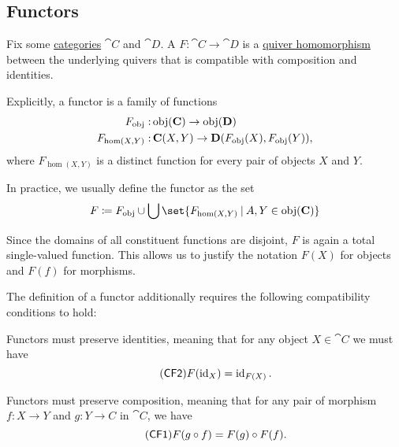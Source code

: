 \subsection{Functors}\label{subsec:functors}

\begin{definition}\label{def:functor}
  Fix some \hyperref[def:category]{categories} \( \cat{C} \) and \( \cat{D} \). A  \( F: \cat{C} \to \cat{D} \) is a \hyperref[def:theory_of_graphs/quiver_homomorphism]{quiver homomorphism} between the underlying quivers that is compatible with composition and identities.

  Explicitly, a functor is a family of functions
  \begin{equation}\label{eq:def:functor_as_family_of_function}
    \begin{aligned}
      F_{\operatorname{obj}}:       &\operatorname{obj}(\operatorname{\mathbf{C}}) \to \operatorname{obj}(\operatorname{\mathbf{D}}) \\
      F_{\hom(X, Y)}: &\operatorname{\mathbf{C}}(X, Y) \to \operatorname{\mathbf{D}}(F_{\operatorname{obj}}(X), F_{\operatorname{obj}}(Y)),
    \end{aligned}
  \end{equation}
  where \( F_{\hom(X, Y)} \) is a distinct function for every pair of objects \( X \) and \( Y \).

  In practice, we usually define the functor as the set
  \begin{equation}\label{eq:def:functor_as_single_function}
    F \coloneqq F_{\obj} \cup \bigcup\set{ F_{\hom(X, Y)} \given A, Y \in \obj(\cat{C}) }
  \end{equation}

  Since the domains of all constituent functions are disjoint, \( F \) is again a total single-valued function. This allows us to justify the notation \( F(X) \) for objects and \( F(f) \) for morphisms.

  The definition of a functor additionally requires the following compatibility conditions to hold:
  \begin{thmenum}[series=def:functor]
     Functors must preserve identities, meaning that for any object \( X \in \cat{C} \) we must have
    \begin{equation}\label{eq:def:category/CF2}\tag{\logic{CF2}}
      F(\id_X) = \id_{F(X)}.
    \end{equation}

     Functors must preserve composition, meaning that for any pair of morphism \( f: X \to Y \) and \( g: Y \to C \) in \( \cat{C} \), we have
    \begin{equation}\label{eq:def:category/CF1}\tag{\logic{CF1}}
      F(g \bincirc f) = F(g) \bincirc F(f).
    \end{equation}
  \end{thmenum}


\end{definition}
